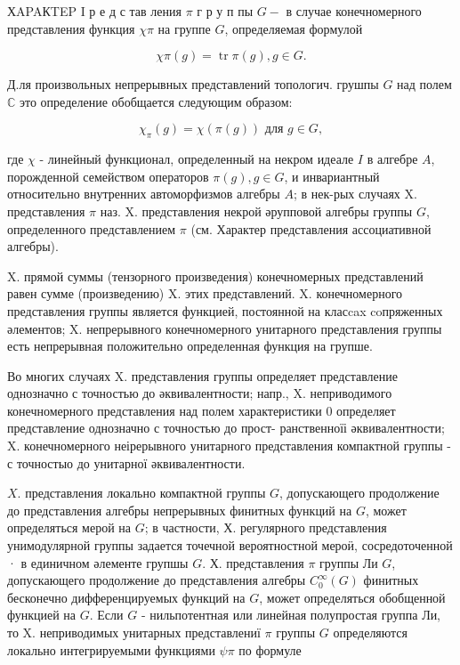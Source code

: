 \documentclass[10pt]{article}
\begin{document}
ХAPAКTEP I р е д с тав ления $\pi$ г р у п пы $G-$ в случае конечномерного представления функция $\chi \pi$ на группе $G$, определяемая формулой



\[

\chi \pi(g)=\operatorname{tr} \pi(g), g \in G .

\]



Д.ля произвольных непрерывных представлений топологич. грушпы $G$ над полем $\mathbb{C}$ это определение обобщается следующим образом:



\[

\chi_{\pi}(g)=\chi(\pi(g)) \text { для } g \in G,

\]



где $\chi$ - линейный функционал, определенный на некром идеале $I$ в алгебре $A$, порожденной семейством операторов $\pi(g), g \in G$, и инвариантный относительно внутренних автоморфизмов алгебры $A$; в нек-рых случаях X. представления $\pi$ наз. X. представления некрой әрупповой алгебры группы $G$, определенного представлением $\pi$ (см. Характер представления ассоциативной алгебры).



X. прямой суммы (тензорного произведения) конечномерных представлений равен сумме (произведению) $\mathrm{X}$. этих представлений. $\mathrm{X}$. конечномерного представления группы является функцией, постоянной на класcax coпряженных әлементов; X. непрерывного конечномерного унитарного представления группы есть непрерывная положительно определенная функция на групше.



Во многих случаях X. представления группы определяет представление однозначно с точностью до әквивалентности; напр., X. неприводимого конечномерного представления над полем характеристики 0 определяет представление однозначно с точностью до прост- ранственноїі әквивалентности; X. конечномерного неірерывного унитарного представления компактной группы - с точностыо до унитарної әквивалентности.



$X$. представления локально компактной группы $G$, допускающего продолжение до представления алгебры непрерывных финитных функций на $G$, может определяться мерой на $G$; в частности, Х. регулярного представления унимодулярной группы задается точечной вероятностной мероӥ, сосредоточенной · в единичном әлементе групшы $G$. Х. представления $\pi$ группы Ли $G$, допускающего продолжение до представления алгебры $C_{0}^{\infty}(G)$ финитных бесконечно дифференцируемых функций на $G$, может определяться обобщенной функцией на $G$. Если $G$ - нильпотентная или линейная полупростая группа Ли, то X. неприводимых унитарных представлениї $\pi$ группы $G$ определяются локально интегрируемыми функциями $\psi \pi$ по формуле
\end{document}

